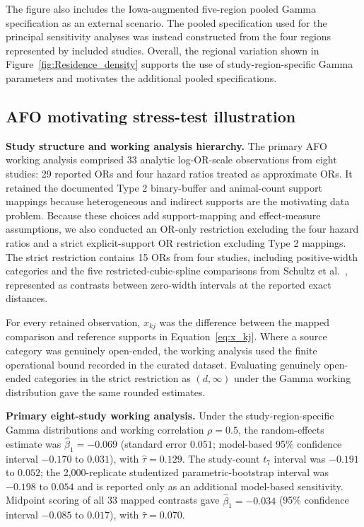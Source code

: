 \documentclass[journal=rsm]{CUP-JNL-DTM}%
\theoremstyle{definition}
\numberwithin{equation}{section}
\begin{document}
The figure also includes the Iowa-augmented five-region pooled Gamma specification as an external scenario. The pooled specification used for the principal sensitivity analyses was instead constructed from the four regions represented by included studies. Overall, the regional variation shown in Figure~\ref{fig:Residence_density} supports the use of study-region-specific Gamma parameters and motivates the additional pooled specifications.


\subsection{AFO motivating stress-test illustration}

\noindent\textbf{Study structure and working analysis hierarchy.}
The primary AFO working analysis comprised 33 analytic log-OR-scale
observations from eight studies: 29 reported ORs and four hazard ratios treated
as approximate ORs. It retained the documented Type 2 binary-buffer and
animal-count support mappings because heterogeneous and indirect supports are
the motivating data problem. Because these choices add support-mapping and
effect-measure assumptions, we also conducted an OR-only restriction excluding
the four hazard ratios and a strict explicit-support OR restriction excluding
Type 2 mappings. The strict restriction contains 15 ORs from four studies,
including positive-width categories and the five restricted-cubic-spline
comparisons from Schultz et al.~\cite{Schultz2019}, represented as contrasts
between zero-width intervals at the reported exact distances.

For every retained observation, $x_{kj}$ was the difference between the mapped
comparison and reference supports in Equation~\eqref{eq:x_kj}. Where a source
category was genuinely open-ended, the working analysis used the finite
operational bound recorded in the curated dataset. Evaluating genuinely open-
ended categories in the strict restriction as $(d,\infty)$ under the Gamma
working distribution gave the same rounded estimates.

\noindent\textbf{Primary eight-study working analysis.}
Under the study-region-specific Gamma distributions and working correlation
$\rho=0.5$, the random-effects estimate was $\hat\beta_1=-0.069$ (standard
error $0.051$; model-based 95\% confidence interval $-0.170$ to $0.031$), with
$\hat\tau=0.129$. The study-count $t_7$ interval was $-0.191$ to $0.052$;
the 2,000-replicate studentized parametric-bootstrap interval was $-0.198$ to
$0.054$ and is reported only as an additional model-based sensitivity.
Midpoint scoring of all 33 mapped contrasts gave $\hat\beta_1=-0.034$
(95\% confidence interval $-0.085$ to $0.017$), with $\hat\tau=0.070$.
\end{document}
